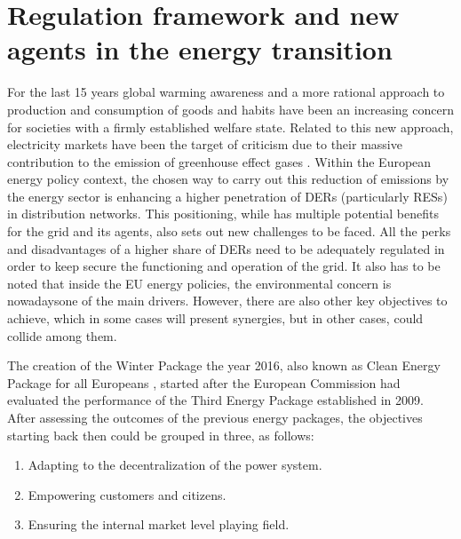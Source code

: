 \section{Regulation framework and new agents in the energy transition}
For the last 15 years global warming awareness and a more rational approach to production and consumption of goods and habits have been an increasing concern for societies with a firmly established welfare state. Related to this new approach, electricity markets have been the target of criticism due to their massive contribution to the emission of greenhouse effect gases \cite{Hancher2017}. Within the European energy policy context, the chosen way to carry out this reduction of emissions by the energy sector is enhancing a higher penetration of DERs (particularly RESs) in distribution networks. This positioning, while has multiple potential benefits for the grid and its agents, also sets out new challenges to be faced.
All the perks and disadvantages of a higher share of DERs need to be adequately regulated in order to keep secure the functioning and operation of the grid. It also has to be noted that inside the EU energy policies, the environmental concern is nowadaysone of the main drivers. However, there are also other key objectives to achieve, which in some cases will present synergies, but in other cases, could collide among them. 

The creation of the Winter Package the year 2016, also known as Clean Energy Package for all Europeans \cite{validzic2017clean}, started after the European Commission had evaluated the performance of the Third Energy Package established in 2009.  After assessing the outcomes of the previous energy packages, the objectives starting back then could be grouped in three, as follows: 
\begin{enumerate}
\item Adapting to the decentralization of the power system. 
\item Empowering customers and citizens. 
\item Ensuring the internal market level playing field. 
\end{enumerate}

